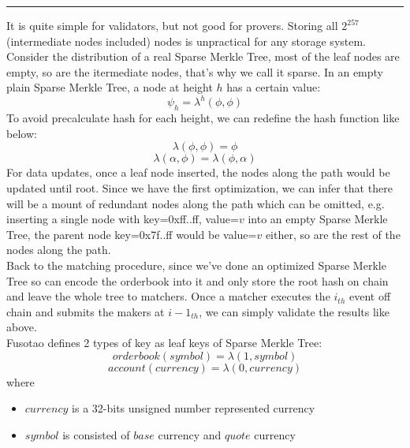 \documentclass[a4paper,12pt]{article}
\begin{document}
\noindent\rule{\textwidth}{0.5pt}
It is quite simple for validators, but not good for provers. Storing all \(2^{257}\) (intermediate nodes included) nodes is unpractical for any storage system. Consider the distribution of a real Sparse Merkle Tree, most of the leaf nodes are empty, so are the itermediate nodes, that's why we call it sparse. In an empty plain Sparse Merkle Tree, a node at height \(h\) has a certain value:\\
\begin{equation*}
    \psi_{h} = \lambda^{h}(\phi, \phi)
\end{equation*}
To avoid precalculate hash for each height, we can redefine the hash function like below:\\
\begin{equation*}
    \lambda(\phi, \phi) = \phi
\end{equation*}
\begin{equation*}
    \lambda(\alpha, \phi) = \lambda(\phi, \alpha)
\end{equation*}
For data updates, once a leaf node inserted, the nodes along the path would be updated until root. Since we have the first optimization, we can infer that there will be a mount of redundant nodes along the path which can be omitted, e.g. inserting a single node with key=0xff..ff, value=\(v\) into an empty Sparse Merkle Tree, the parent node key=0x7f..ff would be value=\(v\) either, so are the rest of the nodes along the path.\\
Back to the matching procedure, since we've done an optimized Sparse Merkle Tree so can encode the orderbook into it and only store the root hash on chain and leave the whole tree to matchers. Once a matcher executes the \(i_{th}\) event off chain and submits the makers at \(i-1_{th}\), we can simply validate the results like above.\\
Fusotao defines 2 types of key as leaf keys of Sparse Merkle Tree:\\
\begin{equation*}
    orderbook(symbol) = \lambda(1, symbol)
\end{equation*}
\begin{equation*}
    account(currency) = \lambda(0, currency)
\end{equation*}
where\\
\begin{itemize}
    \item $currency$ is a 32-bits unsigned number represented currency
    \item $symbol$ is consisted of $base$ currency and $quote$ currency
\end{itemize}
\end{document}
